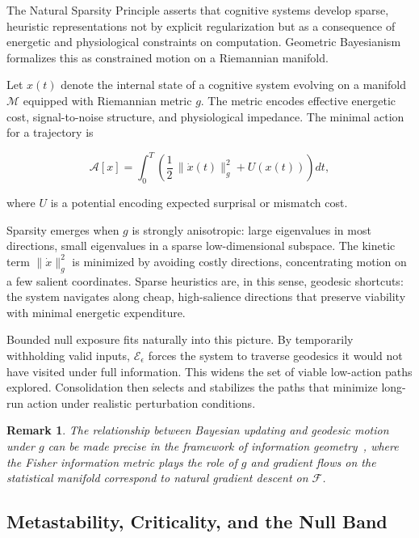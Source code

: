 \documentclass[11pt]{article}
\newtheorem{remark}{Remark}
\theoremstyle{remark}
\begin{document}
The Natural Sparsity Principle asserts that cognitive systems develop sparse, heuristic representations not by explicit regularization but as a consequence of energetic and physiological constraints on computation. Geometric Bayesianism formalizes this as constrained motion on a Riemannian manifold.

Let $x(t)$ denote the internal state of a cognitive system evolving on a manifold $\mathcal{M}$ equipped with Riemannian metric $g$. The metric encodes effective energetic cost, signal-to-noise structure, and physiological impedance. The minimal action for a trajectory is

\begin{equation}
\mathcal{A}[x] = \int_0^T \left( \frac{1}{2}\,\|\dot{x}(t)\|_g^2 + U(x(t)) \right) dt,
\label{eq:action}
\end{equation}

where $U$ is a potential encoding expected surprisal or mismatch cost.

Sparsity emerges when $g$ is strongly anisotropic: large eigenvalues in most directions, small eigenvalues in a sparse low-dimensional subspace. The kinetic term $\|\dot{x}\|_g^2$ is minimized by avoiding costly directions, concentrating motion on a few salient coordinates. Sparse heuristics are, in this sense, geodesic shortcuts: the system navigates along cheap, high-salience directions that preserve viability with minimal energetic expenditure.

Bounded null exposure fits naturally into this picture. By temporarily withholding valid inputs, $\mathcal{E}_\epsilon$ forces the system to traverse geodesics it would not have visited under full information. This widens the set of viable low-action paths explored. Consolidation then selects and stabilizes the paths that minimize long-run action under realistic perturbation conditions.

\begin{remark}
The relationship between Bayesian updating and geodesic motion under $g$ can be made precise in the framework of information geometry~\cite{amari}, where the Fisher information metric plays the role of $g$ and gradient flows on the statistical manifold correspond to natural gradient descent on $\mathcal{F}$.
\end{remark}

\subsection{Metastability, Criticality, and the Null Band}
\end{document}
